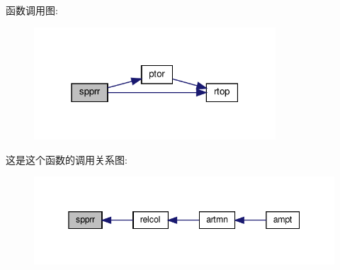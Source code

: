 函数调用图\+:
\nopagebreak
\begin{figure}[H]
\begin{center}
\leavevmode
\includegraphics[width=256pt]{spprr_8f90_a2057ccb0cc7b873244414a55ec151fbc_cgraph}
\end{center}
\end{figure}
这是这个函数的调用关系图\+:
\nopagebreak
\begin{figure}[H]
\begin{center}
\leavevmode
\includegraphics[width=345pt]{spprr_8f90_a2057ccb0cc7b873244414a55ec151fbc_icgraph}
\end{center}
\end{figure}

